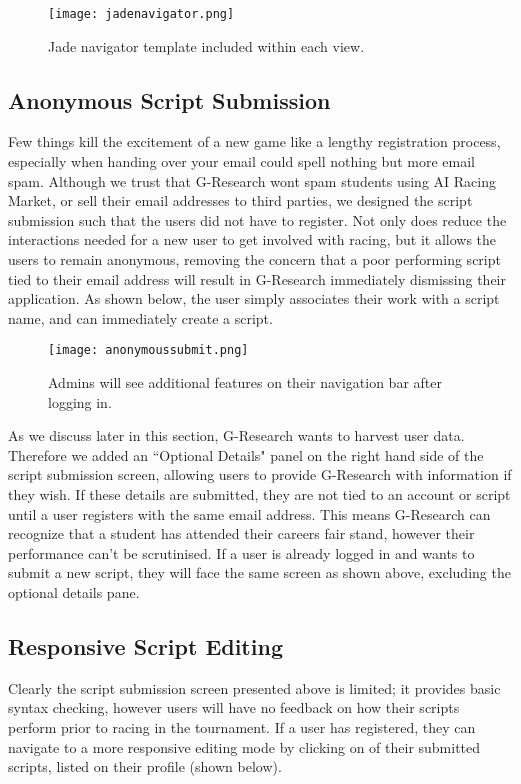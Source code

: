\begin{figure}[H]
\centering
\texttt{[image: jadenavigator.png]}
\caption{Jade navigator template included within each view.}
\end{figure}

\subsection{Anonymous Script Submission}

Few things kill the excitement of a new game like a lengthy registration process, especially when handing over your email could spell nothing but more email spam. Although we trust that G-Research wont spam students using AI Racing Market, or sell their email addresses to third parties, we designed the script submission such that the users did not have to register. Not only does reduce the interactions needed for a new user to get involved with racing, but it allows the users to remain anonymous, removing the concern that a poor performing script tied to their email address will result in G-Research immediately dismissing their application. As shown below, the user simply associates their work with a script name, and can immediately create a script.

\begin{figure}[H]
\centering
\texttt{[image: anonymoussubmit.png]}
\caption{Admins will see additional features on their navigation bar after logging in.}
\end{figure}

As we discuss later in this section, G-Research wants to harvest user data.  Therefore we added an ``Optional Details" panel on the right hand side of the script submission screen, allowing users to provide G-Research with information if they wish. If these details are submitted, they are not tied to an account or script until a user registers with the same email address. This means G-Research can recognize that a student has attended their careers fair stand, however their performance can't be scrutinised. If a user is already logged in and wants to submit a new script, they will face the same screen as shown above, excluding the optional details pane.

\subsection{Responsive Script Editing}

Clearly the script submission screen presented above is limited; it provides basic syntax checking, however users will have no feedback on how their scripts perform prior to racing in the tournament. If a user has registered, they can navigate to a more responsive editing mode by clicking on of their submitted scripts, listed on their profile (shown below).

